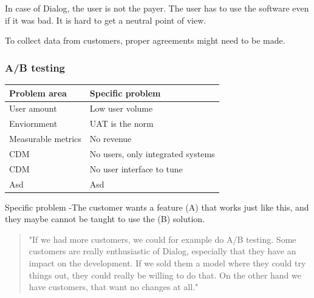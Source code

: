 \documentclass[english]{tktltiki2}
\theoremstyle{definition}
\theoremstyle{remark}
\begin{document}
In case of Dialog, the user is not the payer. The user has to use the software even if it was bad. It is hard to get a neutral point of view. 

To collect data from customers, proper agreements might need to be made.


\subsubsection{A/B testing}

\begin{center}
    \begin{tabular}{ | l | p{5cm} |}
    \hline
    Problem area & Specific problem \\ \hline
    User amount & Low user volume \\ \hline
    Enviornment & UAT is the norm \\ \hline
    Measurable metrics & No revenue \\ \hline
	CDM & No users, only integrated systems \\ \hline
	CDM & No user interface to tune \\ \hline
	Asd & Asd \\
    \hline
    \end{tabular}
\end{center}


Specific problem
-The customer wants a feature (A) that works just like this, and they maybe cannot be taught to use the (B) solution.

\begin{quote}
"If we had more customers, we could for example do A/B testing. Some customers are really enthusiastic of Dialog, especially that they have an impact on the development. If we sold them a model where they could try things out, they could really be willing to do that. On the other hand we have customers, that want no changes at all."
\end{quote}

\end{document}
